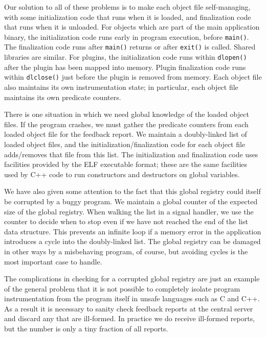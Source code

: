 \documentclass[10pt,twocolumn]{article}
\begin{document}
Our solution to all of these problems is to make each object file
self-managing, with some initialization code that runs when it is
loaded, and finalization code that runs when it is unloaded.  For
objects which are part of the main application binary, the
initialization code runs early in program execution, before
\texttt{main()}.  The finalization code runs after \texttt{main()}
returns or after \texttt{exit()} is called.  Shared libraries are
similar.  For plugins, the initialization code runs within
\texttt{dlopen()} after the plugin has been mapped into memory.
Plugin finalization code runs within \texttt{dlclose()} just before
the plugin is removed from memory.  Each object file also maintains
its own instrumentation state; in particular, each object file maintains
its own predicate counters.

There is one situation in which we need global knowledge of the loaded
object files.  If the program crashes, we must gather
the predicate counters from each loaded object file for the feedback report.
We maintain a doubly-linked list of loaded object files, and the
initialization/finalization code for each object file adds/removes that
file from this list. The initialization and finalization code uses
facilities provided by the ELF executable format; these are the same
facilities used by C++ code to run constructors and destructors on
global variables.

We have also given some attention to the fact that this global
registry could itself be corrupted by a buggy program.  We maintain a
global counter of the expected size of the global registry.  When
walking the list in a signal handler, we use the counter to decide
when to stop even if we have not reached the end of the list data
structure.  This prevents an infinite loop if a memory error in the
application introduces a cycle into the doubly-linked list.  The
global registry can be damaged in other ways by a misbehaving program,
of course, but avoiding cycles is the most important case to handle.

The complications in checking for a corrupted global registry are just
an example of the general problem that it is not possible to
completely isolate program instrumentation from the program itself in
unsafe languages such as C and C++.  As a result it is necessary to
sanity check feedback reports at the central server and discard any
that are ill-formed.  In practice we do receive ill-formed reports,
but the number is only a tiny fraction of all reports.
\end{document}
